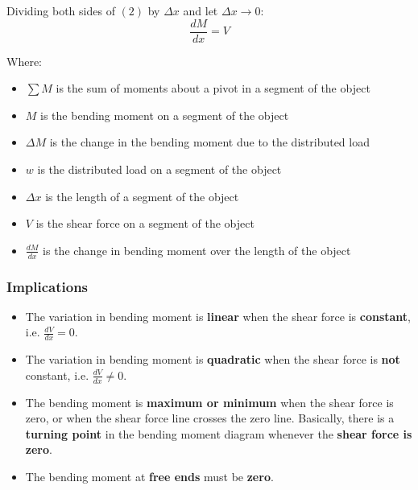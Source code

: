 \documentclass[11pt]{article}
\begin{document}
Dividing both sides of \((2)\) by \(\Delta x\) and let \(\Delta x \rightarrow 0\):
\[\frac{dM}{dx} = V\]

Where:
\begin{itemize}
\item \(\sum M\) is the sum of moments about a pivot in a segment of the object
\item \(M\) is the bending moment on a segment of the object
\item \(\Delta M\) is the change in the bending moment due to the distributed load
\item \(w\) is the distributed load on a segment of the object
\item \(\Delta x\) is the length of a segment of the object
\item \(V\) is the shear force on a segment of the object
\item \(\frac{dM}{dx}\) is the change in bending moment over the length of the object
\end{itemize}

\subsubsection{Implications}
\label{sec:orgda04e9a}
\begin{itemize}
\item The variation in bending moment is \textbf{linear} when the shear force is \textbf{constant}, i.e. \(\frac{dV}{dx} = 0\).
\item The variation in bending moment is \textbf{quadratic} when the shear force is \textbf{not} constant, i.e. \(\frac{dV}{dx} \ne 0\).
\item The bending moment is \textbf{maximum or minimum} when the shear force is zero, or when the shear force line crosses the zero line. Basically, there is a \textbf{turning point} in the bending moment diagram whenever the \textbf{shear force is zero}.
\item The bending moment at \textbf{free ends} must be \textbf{zero}.
\end{itemize}

\newpage
\end{document}
